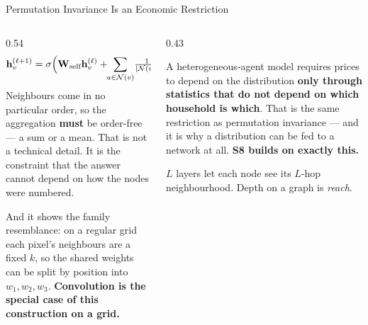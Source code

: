 \begin{frame}{Permutation Invariance Is an Economic Restriction}
\begin{columns}[T]
\begin{column}{0.54\textwidth}
\small
\[
  \mathbf{h}_v^{(\ell+1)}=\sigma\Bigl(\mathbf{W}_{\text{self}}\mathbf{h}_v^{(\ell)}
  +\!\!\sum_{u\in\mathcal{N}(v)}\!\tfrac{1}{|\mathcal{N}(v)|}\mathbf{W}_{\text{neigh}}\mathbf{h}_u^{(\ell)}+\mathbf{b}\Bigr)
\]
Neighbours come in no particular order, so the aggregation \textbf{must} be order-free --- a sum or a mean. That is not a technical detail. It is the constraint that the answer cannot depend on how the nodes were numbered.
\medskip

And it shows the family resemblance: on a regular grid each pixel's neighbours are a fixed $k$, so the shared weights can be split by position into $w_1,w_2,w_3$. \textbf{Convolution is the special case of this construction on a grid.}
\end{column}
\begin{column}{0.43\textwidth}
\begin{takeawaybox}[title=\textbf{Where you have met this already}]\small
A heterogeneous-agent model requires prices to depend on the distribution \textbf{only through statistics that do not depend on which household is which}.
\medskip
That is the same restriction as permutation invariance --- and it is why a distribution can be fed to a network at all. \textbf{S8 builds on exactly this.}
\end{takeawaybox}
\medskip
\begin{examplebox}\footnotesize
$L$ layers let each node see its $L$-hop neighbourhood. Depth on a graph is \emph{reach}.
\end{examplebox}
\end{column}
\end{columns}
\vspace{1mm}
\end{frame}

